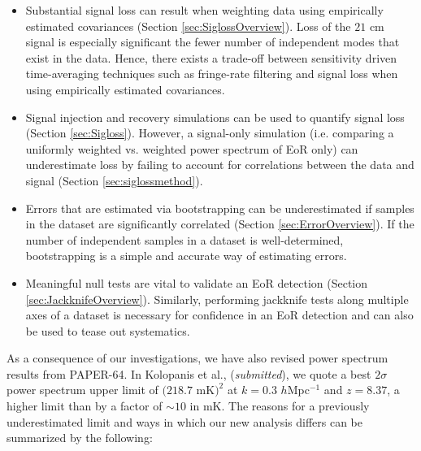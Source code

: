 \documentclass[preprint2,numberedappendix,tighten]{aastex6}  %
\begin{document}
\begin{itemize}
\item Substantial signal loss can result when weighting data using empirically estimated covariances (Section 
\ref{sec:SiglossOverview}). Loss of the $21$ cm signal is especially significant the fewer number of independent modes that
exist in the data. Hence, there exists a trade-off between sensitivity driven 
time-averaging techniques such as fringe-rate filtering and signal loss when using empirically estimated covariances. 
\item Signal injection and recovery simulations can be used to quantify signal loss (Section \ref{sec:Sigloss}). However, a 
signal-only simulation (i.e. comparing a uniformly weighted vs. weighted power spectrum of EoR only) can underestimate loss by 
failing to account for correlations between the data and signal (Section \ref{sec:siglossmethod}).
\item Errors that are estimated via bootstrapping can be underestimated if samples in the dataset are significantly correlated 
(Section \ref{sec:ErrorOverview}). If the number of independent samples in a dataset is well-determined, bootstrapping is a 
simple and accurate way of estimating errors.
\item Meaningful null tests are vital to validate an EoR detection (Section \ref{sec:JackknifeOverview}). Similarly, performing 
jackknife tests along multiple axes of a dataset is necessary for confidence in an EoR detection and can also be used to tease 
out systematics.
\end{itemize}

As a consequence of our investigations, we have also revised power spectrum results from PAPER-64. In Kolopanis et al., (\textit{submitted}), we quote a best $2\sigma$ power spectrum upper limit of $(218.7$ mK$)^{2}$ at $k=0.3$ $h$Mpc$^{-1}$ and $z=8.37$, 
a higher limit than  by a factor of $\sim$$10$ in mK. The reasons for a previously underestimated limit and 
ways in which our new analysis differs can be summarized by the following:
\end{document}
